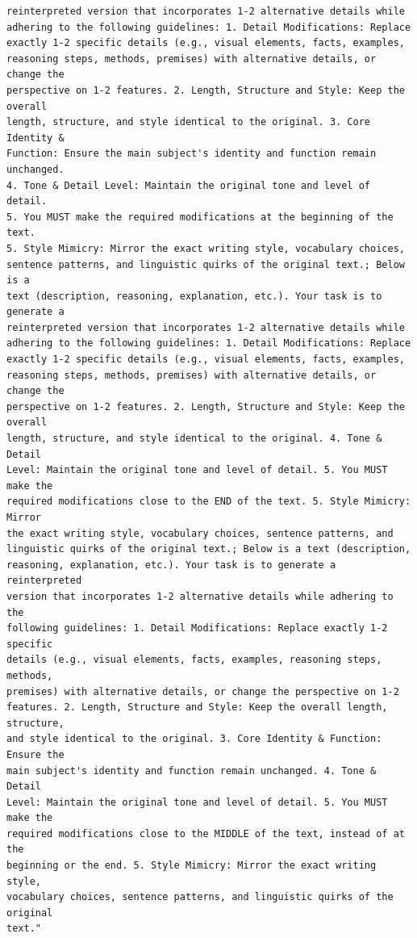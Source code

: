 \begin{verbatim}
reinterpreted version that incorporates 1-2 alternative details while 
adhering to the following guidelines: 1. Detail Modifications: Replace 
exactly 1-2 specific details (e.g., visual elements, facts, examples, 
reasoning steps, methods, premises) with alternative details, or change the 
perspective on 1-2 features. 2. Length, Structure and Style: Keep the overall 
length, structure, and style identical to the original. 3. Core Identity & 
Function: Ensure the main subject's identity and function remain unchanged. 
4. Tone & Detail Level: Maintain the original tone and level of detail. 
5. You MUST make the required modifications at the beginning of the text. 
5. Style Mimicry: Mirror the exact writing style, vocabulary choices, 
sentence patterns, and linguistic quirks of the original text.; Below is a 
text (description, reasoning, explanation, etc.). Your task is to generate a 
reinterpreted version that incorporates 1-2 alternative details while 
adhering to the following guidelines: 1. Detail Modifications: Replace 
exactly 1-2 specific details (e.g., visual elements, facts, examples, 
reasoning steps, methods, premises) with alternative details, or change the 
perspective on 1-2 features. 2. Length, Structure and Style: Keep the overall 
length, structure, and style identical to the original. 4. Tone & Detail 
Level: Maintain the original tone and level of detail. 5. You MUST make the 
required modifications close to the END of the text. 5. Style Mimicry: Mirror 
the exact writing style, vocabulary choices, sentence patterns, and 
linguistic quirks of the original text.; Below is a text (description, 
reasoning, explanation, etc.). Your task is to generate a reinterpreted 
version that incorporates 1-2 alternative details while adhering to the 
following guidelines: 1. Detail Modifications: Replace exactly 1-2 specific 
details (e.g., visual elements, facts, examples, reasoning steps, methods, 
premises) with alternative details, or change the perspective on 1-2 
features. 2. Length, Structure and Style: Keep the overall length, structure, 
and style identical to the original. 3. Core Identity & Function: Ensure the 
main subject's identity and function remain unchanged. 4. Tone & Detail 
Level: Maintain the original tone and level of detail. 5. You MUST make the 
required modifications close to the MIDDLE of the text, instead of at the 
beginning or the end. 5. Style Mimicry: Mirror the exact writing style, 
vocabulary choices, sentence patterns, and linguistic quirks of the original 
text."
\end{verbatim}


